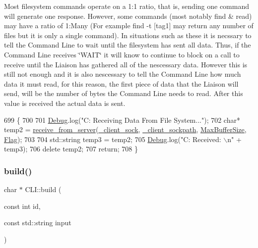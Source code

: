 Most filesystem commands operate on a 1\+:1 ratio, that is, sending one command will generate one response. However, some commands (most notably \textquotesingle{}find\textquotesingle{} \& \textquotesingle{}read\textquotesingle{}) may have a ratio of 1\+:Many (For example \textquotesingle{}find -\/t \mbox{[}tag1\mbox{]}\textquotesingle{} may return any number of files but it is only a single command). In situations such as these it is necssary to tell the Command Line to wait until the filesystem has sent all data. Thus, if the Command Line receives \char`\"{}\+W\+A\+I\+T\char`\"{} it will know to continue to block on a call to receive until the Liaison has gathered all of the nescessary data. However this is still not enough and it is also nescessary to tell the Command Line how much data it must read, for this reason, the first piece of data that the Liaison will send, will be the number of bytes the Command Line needs to read. After this value is received the actual data is sent. 
\begin{DoxyCode}
699 \{
700 
701   \mbox{\hyperlink{_cli_8h_ab6d95a4e6a59b4ad033ed3af31d878e0}{Debug}}.log(\textcolor{stringliteral}{"C: Receiving Data From File System..."});
702   \textcolor{keywordtype}{char}* temp2 = \mbox{\hyperlink{cli__helper_8hpp_a9a7850489cf50a8693b388acc259ccaa}{receive\_from\_server}}(\mbox{\hyperlink{class_c_l_i_a89c215687bff66a3e0359a17bac3657d}{\_client\_sock}}, 
      \mbox{\hyperlink{class_c_l_i_ad3b7579608f8c2e1d4c01a8668f701d9}{\_client\_sockpath}}, \mbox{\hyperlink{_cli_8h_a97a33a33e5428e13cfa0eff5ba0e846f}{MaxBufferSize}}, \mbox{\hyperlink{_cli_8h_a1ca03d8f367ec7987b5a7321fe82e23e}{Flag}});
703 
704   std::string temp3 = temp2;
705   \mbox{\hyperlink{_cli_8h_ab6d95a4e6a59b4ad033ed3af31d878e0}{Debug}}.log(\textcolor{stringliteral}{"C: Received: \(\backslash\)n"} + temp3);
706   \textcolor{keyword}{delete} temp2;
707   \textcolor{keywordflow}{return};
708 \}
\end{DoxyCode}
\mbox{\label{class_c_l_i_a6c3f97b04646b070ad82801adf0dc521}} 
\subsubsection{\texorpdfstring{build()}{build()}}
{\footnotesize\ttfamily char $\ast$ C\+L\+I\+::build (\begin{DoxyParamCaption}\item[{const int}]{id,  }\item[{const std\+::string}]{input }\end{DoxyParamCaption})}

